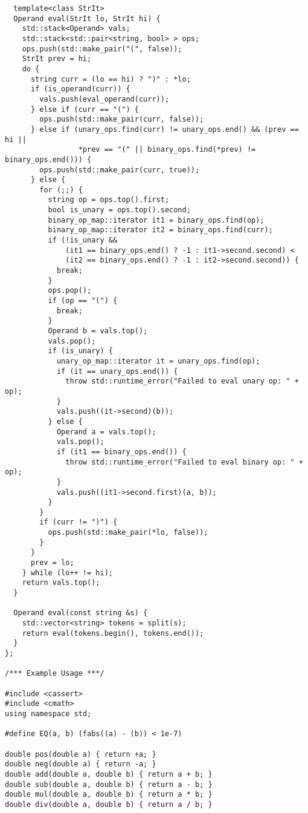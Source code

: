 \begin{lstlisting}
  template<class StrIt>
  Operand eval(StrIt lo, StrIt hi) {
    std::stack<Operand> vals;
    std::stack<std::pair<string, bool> > ops;
    ops.push(std::make_pair("(", false));
    StrIt prev = hi;
    do {
      string curr = (lo == hi) ? ")" : *lo;
      if (is_operand(curr)) {
        vals.push(eval_operand(curr));
      } else if (curr == "(") {
        ops.push(std::make_pair(curr, false));
      } else if (unary_ops.find(curr) != unary_ops.end() && (prev == hi ||
                 *prev == "(" || binary_ops.find(*prev) != binary_ops.end())) {
        ops.push(std::make_pair(curr, true));
      } else {
        for (;;) {
          string op = ops.top().first;
          bool is_unary = ops.top().second;
          binary_op_map::iterator it1 = binary_ops.find(op);
          binary_op_map::iterator it2 = binary_ops.find(curr);
          if (!is_unary &&
              (it1 == binary_ops.end() ? -1 : it1->second.second) <
              (it2 == binary_ops.end() ? -1 : it2->second.second)) {
            break;
          }
          ops.pop();
          if (op == "(") {
            break;
          }
          Operand b = vals.top();
          vals.pop();
          if (is_unary) {
            unary_op_map::iterator it = unary_ops.find(op);
            if (it == unary_ops.end()) {
              throw std::runtime_error("Failed to eval unary op: " + op);
            }
            vals.push((it->second)(b));
          } else {
            Operand a = vals.top();
            vals.pop();
            if (it1 == binary_ops.end()) {
              throw std::runtime_error("Failed to eval binary op: " + op);
            }
            vals.push((it1->second.first)(a, b));
          }
        }
        if (curr != ")") {
          ops.push(std::make_pair(*lo, false));
        }
      }
      prev = lo;
    } while (lo++ != hi);
    return vals.top();
  }

  Operand eval(const string &s) {
    std::vector<string> tokens = split(s);
    return eval(tokens.begin(), tokens.end());
  }
};

/*** Example Usage ***/

#include <cassert>
#include <cmath>
using namespace std;

#define EQ(a, b) (fabs((a) - (b)) < 1e-7)

double pos(double a) { return +a; }
double neg(double a) { return -a; }
double add(double a, double b) { return a + b; }
double sub(double a, double b) { return a - b; }
double mul(double a, double b) { return a * b; }
double div(double a, double b) { return a / b; }


\end{lstlisting}
